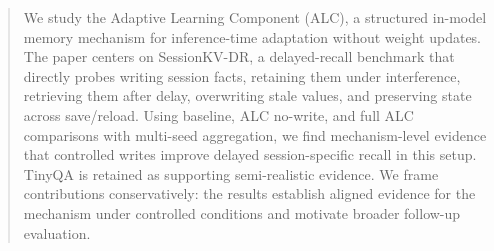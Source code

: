 \begin{abstract}
We study the Adaptive Learning Component (ALC), a structured in-model memory mechanism for inference-time adaptation without weight updates. The paper centers on SessionKV-DR, a delayed-recall benchmark that directly probes writing session facts, retaining them under interference, retrieving them after delay, overwriting stale values, and preserving state across save/reload. Using baseline, ALC no-write, and full ALC comparisons with multi-seed aggregation, we find mechanism-level evidence that controlled writes improve delayed session-specific recall in this setup. TinyQA is retained as supporting semi-realistic evidence. We frame contributions conservatively: the results establish aligned evidence for the mechanism under controlled conditions and motivate broader follow-up evaluation.
\end{abstract}

